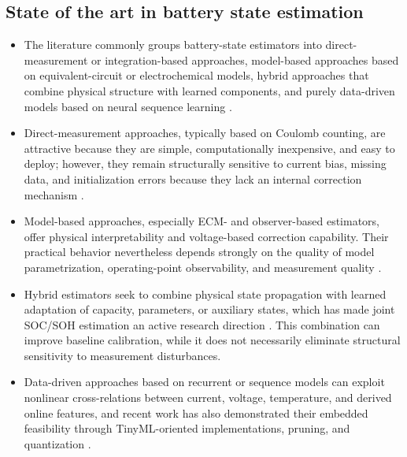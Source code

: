 \documentclass[review,nopreprintline]{elsarticle}
\begin{document}
\subsection{State of the art in battery state estimation}
\begin{itemize}[leftmargin=*]
    \item The literature commonly groups battery-state estimators into direct-measurement or integration-based approaches, model-based approaches based on equivalent-circuit or electrochemical models, hybrid approaches that combine physical structure with learned components, and purely data-driven models based on neural sequence learning \cite{khanComparativeStudyDifferent2022,shrivastavaReviewTechnologicalAdvancement2023,guoSystematicReviewElectrochemical2024,yaoSmarterBatteryManagement2025b}.
    \item Direct-measurement approaches, typically based on Coulomb counting, are attractive because they are simple, computationally inexpensive, and easy to deploy; however, they remain structurally sensitive to current bias, missing data, and initialization errors because they lack an internal correction mechanism \cite{khanComparativeStudyDifferent2022,liRobustnessSOCEstimation2015}.
    \item Model-based approaches, especially ECM- and observer-based estimators, offer physical interpretability and voltage-based correction capability. Their practical behavior nevertheless depends strongly on the quality of model parametrization, operating-point observability, and measurement quality \cite{gaoEnhancedStateofchargeEstimation2022,guoSystematicReviewElectrochemical2024,liRobustnessSOCEstimation2015}.
    \item Hybrid estimators seek to combine physical state propagation with learned adaptation of capacity, parameters, or auxiliary states, which has made joint SOC/SOH estimation an active research direction \cite{gaoCoEstimationStateofChargeStateof2022,shenAlternativeCombinedCoestimation2022,wangFusionEstimationLithiumion2022}. This combination can improve baseline calibration, while it does not necessarily eliminate structural sensitivity to measurement disturbances.
    \item Data-driven approaches based on recurrent or sequence models can exploit nonlinear cross-relations between current, voltage, temperature, and derived online features, and recent work has also demonstrated their embedded feasibility through TinyML-oriented implementations, pruning, and quantization \cite{mondalEstimatingStateofChargeLithiumIon2024,Embedded_AI_only_SOC_mobile,giazitzisCaseStudyTiny2024,mazziStateChargeEstimation2022,yaoSmarterBatteryManagement2025b}.
\end{itemize}
\end{document}
